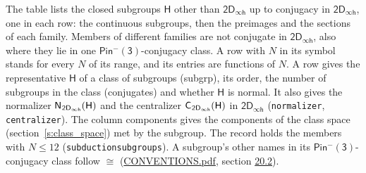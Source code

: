 \documentclass[10pt,a4paper]{article}
\numberwithin{equation}{section}
\newcommand{\grp}[1]{\mathsf{#1}}
\newcommand{\samecls}{\cong}
\newcommand{\hairsp}{\mkern1mu}
\begin{document}
\leavevmode\label{n:group.H}The table lists the closed subgroups $\grp{H}$ other than $\grp{2D_{\infty h}}$ up to conjugacy in $\grp{2D_{\infty h}}$, one in each row: the continuous subgroups, then the preimages and the sections of each family. Members of different families are not conjugate in $\grp{2D_{\infty h}}$, also where they lie in one \href{Pinminus3.pdf}{$\grp{Pin^{-}(3)}$}-conjugacy class. A row with $N$ in its symbol stands for every $N$ of its range, and its entries are functions of $N$. \label{n:head.subgroup}\label{n:head.order}\label{n:head.conjugates}\label{n:head.normal}A row gives the representative $\grp{H}$ of a class of subgroups (subgrp), its order, the number of subgroups in the class (conjugates) and whether $\grp{H}$ is normal. \label{n:group.normalizer}\label{n:group.centralizer}It also gives the normalizer $\grp{N}_{\hairsp \grp{2D_{\infty h}}}(\grp{H})$ and the centralizer $\grp{C}_{\hairsp \grp{2D_{\infty h}}}(\grp{H})$ in $\grp{2D_{\infty h}}$ (\texttt{normalizer}, \texttt{centralizer}). \label{n:head.components}The column components gives the components of the class space (section~\ref{s:class_space}) met by the subgroup. The record holds the members with $N \le 12$ (\texttt{subductionsubgroups}). A subgroup's other names in its \href{Pinminus3.pdf}{$\grp{Pin^{-}(3)}$}-conjugacy class follow $\samecls$ (\href{../../CONVENTIONS.pdf}{CONVENTIONS.pdf}, section \href{../../CONVENTIONS.pdf\#conv.20.2}{20.2}).
\end{document}
